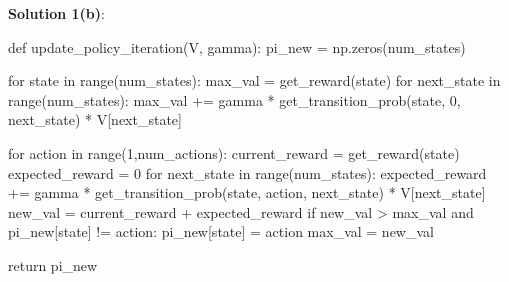 \documentclass[submit]{harvardml}
\begin{document}
\textbf{Solution 1(b)}:\\
\begin{python}
    def update_policy_iteration(V, gamma):
    pi_new = np.zeros(num_states)

    for state in range(num_states):
        max_val = get_reward(state)
        for next_state in range(num_states):
            max_val += gamma * get_transition_prob(state, 0, next_state) * V[next_state]
        
        for action in range(1,num_actions):
            current_reward = get_reward(state)
            expected_reward = 0
            for next_state in range(num_states):
                expected_reward += gamma * get_transition_prob(state, action, next_state) * V[next_state]
            new_val = current_reward + expected_reward
            if new_val > max_val and pi_new[state] != action:
                pi_new[state] = action
                max_val = new_val

    return pi_new
\end{python}
\newpage
\end{document}
